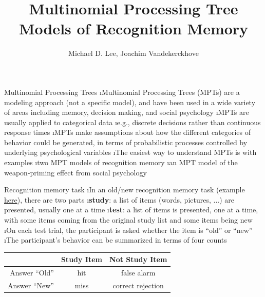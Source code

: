 \documentclass[10pt]{beamer}
\title{Multinomial Processing Tree Models of Recognition Memory}
\author[shortname]{Michael D. Lee, Joachim Vandekerckhove}
\begin{document}
\maketitle

\begin{frame}[fragile]{Multinomial Processing Trees}
\bi
\i Multinomial Processing Trees (MPTs) are a modeling approach (not a specific model), and have been used in a wide variety of areas including memory, decision making, and social psychology \cite{BatchelderRiefer1980,erdfelder2009multinomial}
\i MPTs are usually applied to categorical data
\bi
\i e.g., discrete decisions rather than continuous response times 
\ei
\i MPTs make assumptions about how the different categories of behavior could be generated, in terms of probabilistic processes controlled by underlying psychological variables
\i The easiest way to understand MPTs is with examples
\bi
\i two MPT models of recognition memory
\i an MPT model of the weapon-priming effect from social psychology
\ei
\ei
\end{frame}

\begin{frame}[fragile]{Recognition memory task}
\bi
\i In an old/new recognition memory task (example \href{https://youtu.be/57fp4Cjtmq0}{here}), there are two parts
\bi
\i \textbf{study}: a list of items (words, pictures, ...) are presented, usually one at a time
\i \textbf{test}: a list of items is presented, one at a time, with some items coming from the original study list and some items being new
\ei
\i On each test trial, the participant is asked whether the item is ``old'' or ``new''
\i The participant's behavior can be summarized in terms of four counts
\vspace{0.5em}
\begin{center}
\begin{tabular}{rcc}
\toprule
& Study Item & Not Study Item \\
\hline
Answer ``Old'' & hit & false alarm \\
Answer ``New'' & miss & correct rejection\\
\bottomrule
\end{tabular}
\end{center}
\vspace{0.5em}
\ei
\end{frame}
\end{document}
